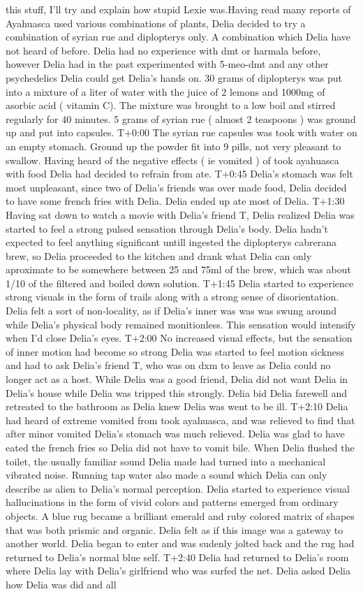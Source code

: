 \documentclass[12pt]{book}
\begin{document}
this stuff, I'll try and explain how stupid Lexie was.Having read many reports of Ayahuasca used various combinations of plants, Delia decided to try a combination of syrian rue and diplopterys only. A combination which Delia have not heard of before. Delia had no experience with dmt or harmala before, however Delia had in the past experimented with 5-meo-dmt and any other psychedelics Delia could get Delia's hands on. 30 grams of diplopterys was put into a mixture of a liter of water with the juice of 2 lemons and 1000mg of asorbic acid ( vitamin C). The mixture was brought to a low boil and stirred regularly for 40 minutes. 5 grams of syrian rue ( almost 2 teaspoons ) was ground up and put into capsules. T+0:00 The syrian rue capsules was took with water on an empty stomach. Ground up the powder fit into 9 pills, not very pleasant to swallow. Having heard of the negative effects ( ie vomited ) of took ayahuasca with food Delia had decided to refrain from ate. T+0:45 Delia's stomach was felt most unpleasant, since two of Delia's friends was over made food, Delia decided to have some french fries with Delia. Delia ended up ate most of Delia. T+1:30 Having sat down to watch a movie with Delia's friend T, Delia realized Delia was started to feel a strong pulsed sensation through Delia's body. Delia hadn't expected to feel anything significant untill ingested the diplopterys cabrerana brew, so Delia proceeded to the kitchen and drank what Delia can only aproximate to be somewhere between 25 and 75ml of the brew, which was about 1/10 of the filtered and boiled down solution. T+1:45 Delia started to experience strong visuals in the form of trails along with a strong sense of disorientation. Delia felt a sort of non-locality, as if Delia's inner was was was swung around while Delia's physical body remained monitionless. This sensation would intensify when I'd close Delia's eyes. T+2:00 No increased visual effects, but the sensation of inner motion had become so strong Delia was started to feel motion sickness and had to ask Delia's friend T, who was on dxm to leave as Delia could no longer act as a host. While Delia was a good friend, Delia did not want Delia in Delia's house while Delia was tripped this strongly. Delia bid Delia farewell and retreated to the bathroom as Delia knew Delia was went to be ill. T+2:10 Delia had heard of extreme vomited from took ayahuasca, and was relieved to find that after minor vomited Delia's stomach was much relieved. Delia was glad to have eated the french fries so Delia did not have to vomit bile. When Delia flushed the toilet, the usually familiar sound Delia made had turned into a mechanical vibrated noise. Running tap water also made a sound which Delia can only describe as alien to Delia's normal perception. Delia started to experience visual hallucinations in the form of vivid colors and patterns emerged from ordinary objects. A blue rug became a brilliant emerald and ruby colored matrix of shapes that was both prismic and organic. Delia felt as if this image was a gateway to another world. Delia began to enter and was sudenly jolted back and the rug had returned to Delia's normal blue self. T+2:40 Delia had returned to Delia's room where Delia lay with Delia's girlfriend who was surfed the net. Delia asked Delia how Delia was did and all 
\end{document}
